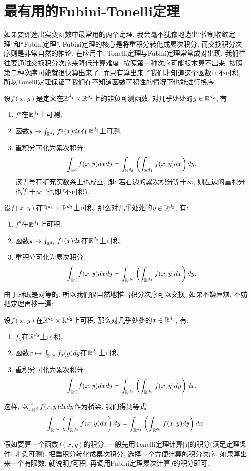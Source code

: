 \section{最有用的Fubini-Tonelli定理}
如果要评选出实变函数中最常用的两个定理, 我会毫不犹豫地选出“控制收敛定理”和“Fubini定理”. 
Fubini定理的核心是将重积分转化成累次积分, 而交换积分次序则是非常自然的推论. 
在应用中, Tonelli定理与Fubini定理常常成对出现. 我们往往要通过交换积分次序来降低计算难度: 按照第一种次序可能根本算不出来, 按照第二种次序可能就很快算出来了. 而只有算出来了我们才知道这个函数可不可积, 所以Tonelli定理保证了我们在不知道函数可积性的情况下也能进行换序! 
\begin{theorem}[Tonelli]
    设$f(x,y)$是定义在$\mathbb{R}^{d_1} \times \mathbb{R}^{d_2}$上的非负可测函数. 对几乎处处的$y \in \mathbb{R}^{d_2}$, 有
    \begin{enumerate}
    \item $f^y$在$\mathbb{R}^{d_1}$上可测, 
    \item 函数$y \mapsto \int_{\mathbb{R}^{d_1}} f^{y}(x)dx$在$\mathbb{R}^{d_2}$上可测,
    \item 重积分可化为累次积分:
    $$\int_{\mathbb{R}^d} f(x,y)dxdy = \int_{\mathbb{R}^{d_2}} \left(\int_{\mathbb{R}^{d_1}}f(x,y)dx\right)dy.$$
    该等号在扩充实数系上也成立, 即: 若右边的累次积分等于$\infty$, 则左边的重积分也等于$\infty$ (也即$f$不可积). 
    \end{enumerate}
\end{theorem}
\begin{theorem}[Fubini]
    设$f(x,y)$在$\mathbb{R}^{d_1} \times \mathbb{R}^{d_2}$上可积. 那么对几乎处处的$y \in \mathbb{R}^{d_2}$, 有:
    \begin{enumerate}
    \item $f^y$在$\mathbb{R}^{d_1}$上可积,
    \item 函数$y \mapsto \int_{\mathbb{R}^{d_1}} f^{y}(x)dx$在$\mathbb{R}^{d_2}$上可积,
    \item 重积分可化为累次积分:
    $$\int_{\mathbb{R}^d} f(x,y)dxdy = \int_{\mathbb{R}^{d_2}} \left(\int_{\mathbb{R}^{d_1}}f(x,y)dx\right)dy.$$
    \end{enumerate}
\end{theorem}
由于$x$和$y$是对等的, 所以我们很自然地推出积分次序可以交换. 如果不嫌麻烦, 不妨把定理再抄一遍:
\begin{theorem}[Fubini定理再抄一遍]
    设$f(x,y)$在$\mathbb{R}^{d_1} \times \mathbb{R}^{d_2}$上可积. 那么对几乎处处的$x \in \mathbb{R}^{d_1}$, 有:
    \begin{enumerate}
    \item $f_x$在$\mathbb{R}^{d_2}$上可积,
    \item 函数$x \mapsto \int_{\mathbb{R}^{d_2}} f_{x}(y)dy$在$\mathbb{R}^{d_1}$上可积,
    \item 重积分可化为累次积分:
    $$\int_{\mathbb{R}^d} f(x,y)dxdy = \int_{\mathbb{R}^{d_1}} \left(\int_{\mathbb{R}^{d_2}}f(x,y)dy\right)dx.$$
    \end{enumerate}
\end{theorem}
这样, 以$\int_{\mathbb{R}^d} f(x,y) dxdy$作为桥梁, 我们得到等式
$$\int_{\mathbb{R}^{d_2}} \left(\int_{\mathbb{R}^{d_1}}f(x,y)dx\right)dy
  =\int_{\mathbb{R}^{d_1}} \left(\int_{\mathbb{R}^{d_2}}f(x,y)dy\right)dx.$$
\begin{remark}
    假如要算一个函数$f(x,y)$的积分, 一般先用Tonelli定理计算$|f|$的积分(满足定理条件: 非负可测).
    把重积分转化成累次积分, 选择一个方便计算的积分次序. 
    如果算出来一个有限数, 就说明$f$可积, 再调用Fubini定理累次计算$f$的积分即可.
\end{remark}

